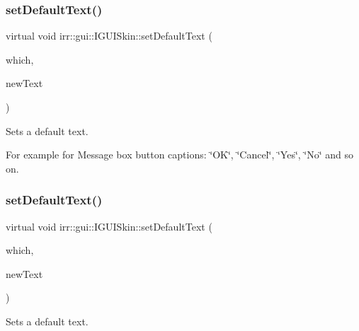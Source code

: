 \subsubsection{\texorpdfstring{set\+Default\+Text()}{setDefaultText()}\hspace{0.1cm}{\footnotesize\ttfamily [1/2]}}
{\footnotesize\ttfamily virtual void irr\+::gui\+::\+I\+G\+U\+I\+Skin\+::set\+Default\+Text (\begin{DoxyParamCaption}\item[{\hyperlink{namespaceirr_1_1gui_a18bc64c635f8b0db66498d779569e296}{E\+G\+U\+I\+\_\+\+D\+E\+F\+A\+U\+L\+T\+\_\+\+T\+E\+XT}}]{which,  }\item[{const wchar\+\_\+t $\ast$}]{new\+Text }\end{DoxyParamCaption})\hspace{0.3cm}{\ttfamily [pure virtual]}}



Sets a default text. 

For example for Message box button captions\+: \char`\"{}\+O\+K\char`\"{}, \char`\"{}\+Cancel\char`\"{}, \char`\"{}\+Yes\char`\"{}, \char`\"{}\+No\char`\"{} and so on. \mbox{\label{classirr_1_1gui_1_1IGUISkin_a782a67363479b5cf7d085189774908ef}} 
\subsubsection{\texorpdfstring{set\+Default\+Text()}{setDefaultText()}\hspace{0.1cm}{\footnotesize\ttfamily [2/2]}}
{\footnotesize\ttfamily virtual void irr\+::gui\+::\+I\+G\+U\+I\+Skin\+::set\+Default\+Text (\begin{DoxyParamCaption}\item[{\hyperlink{namespaceirr_1_1gui_a18bc64c635f8b0db66498d779569e296}{E\+G\+U\+I\+\_\+\+D\+E\+F\+A\+U\+L\+T\+\_\+\+T\+E\+XT}}]{which,  }\item[{const wchar\+\_\+t $\ast$}]{new\+Text }\end{DoxyParamCaption})\hspace{0.3cm}{\ttfamily [pure virtual]}}



Sets a default text. 

